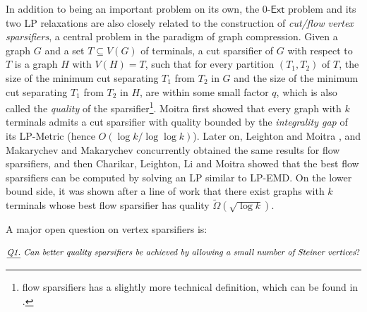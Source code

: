 \documentclass[11pt]{article}
\theoremstyle{definition}
\newcounter{note}
\newcommand{\ze}{$0$-$\textsf{Ext}$\xspace}
\begin{document}
In addition to being an important problem on its own, the \ze problem and its two LP relaxations are also closely related to the construction of \emph{cut/flow vertex sparsifiers}, a central problem in the paradigm of graph compression.
Given a graph $G$ and a set $T\subseteq V(G)$ of terminals, a cut sparsifier of $G$ with respect to $T$ is a graph $H$ with $V(H)=T$, such that for every partition $(T_1,T_2)$ of $T$, the size of the minimum cut separating $T_1$ from $T_2$ in $G$ and the size of the minimum cut separating $T_1$ from $T_2$ in $H$, are within some small factor $q$, which is also called the \emph{quality} of the sparsifier\footnote{flow sparsifiers has a slightly more technical definition, which can be found in \cite{hagerup1998characterizing,leighton2010extensions,chuzhoy2012vertex,andoni2014towards}.}.
Moitra \cite{moitra2009approximation} first showed that every graph with $k$ terminals admits a cut sparsifier with quality bounded by the \emph{integrality gap} of its \textsf{LP-Metric} (hence $O(\log k/\log\log k)$). Later on, Leighton and Moitra \cite{leighton2010extensions}, and Makarychev and Makarychev \cite{makarychev2010metric} concurrently obtained the same results for flow sparsifiers, and then Charikar, Leighton, Li and Moitra \cite{charikar2010vertex} showed that the best flow sparsifiers can be computed by solving an LP similar to \textsf{LP-EMD}. On the lower bound side, it was shown after a line of work \cite{leighton2010extensions,charikar2010vertex,makarychev2010metric} that there exist graphs with $k$ terminals whose best flow sparsifier has quality $\tilde\Omega(\sqrt{\log k})$.


A major open question on vertex sparsifiers is: 

\vspace{-10pt}
\[\emph{\underline{Q1.} Can better quality sparsifiers be achieved by allowing a small number of Steiner vertices}? 
\]
\vspace{-10pt}
\end{document}
